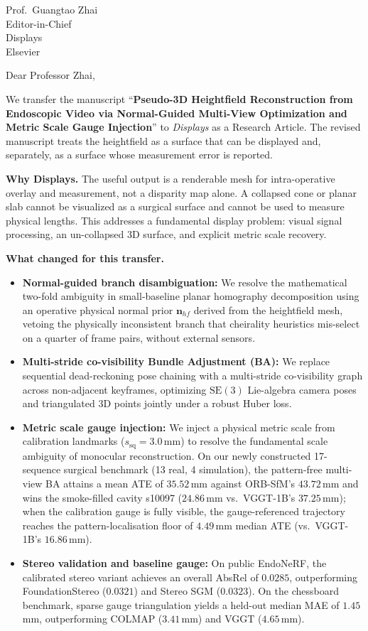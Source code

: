 \documentclass[12pt]{letter}
\begin{document}
\begin{letter}{Prof.\ Guangtao Zhai\\
Editor-in-Chief\\
Displays\\
Elsevier}

\opening{Dear Professor Zhai,}

We transfer the manuscript
``\textbf{Pseudo-3D Heightfield Reconstruction from Endoscopic Video via Normal-Guided Multi-View Optimization and Metric Scale Gauge Injection}''
to \textit{Displays} as a Research Article. The revised manuscript treats the heightfield as a surface that can be displayed and, separately, as a surface whose measurement error is reported.

\textbf{Why Displays.}
The useful output is a renderable mesh for intra-operative overlay and measurement, not a disparity map alone. A collapsed cone or planar slab cannot be visualized as a surgical surface and cannot be used to measure physical lengths. This addresses a fundamental display problem: visual signal processing, an un-collapsed 3D surface, and explicit metric scale recovery.

\textbf{What changed for this transfer.}
\begin{itemize}
    \item \textbf{Normal-guided branch disambiguation:} We resolve the mathematical two-fold ambiguity in small-baseline planar homography decomposition using an operative physical normal prior $\mathbf{n}_{hf}$ derived from the heightfield mesh, vetoing the physically inconsistent branch that cheirality heuristics mis-select on a quarter of frame pairs, without external sensors.
    \item \textbf{Multi-stride co-visibility Bundle Adjustment (BA):} We replace sequential dead-reckoning pose chaining with a multi-stride co-visibility graph across non-adjacent keyframes, optimizing $\mathrm{SE}(3)$ Lie-algebra camera poses and triangulated 3D points jointly under a robust Huber loss.
    \item \textbf{Metric scale gauge injection:} We inject a physical metric scale from calibration landmarks ($s_{\mathrm{sq}} = 3.0$\,mm) to resolve the fundamental scale ambiguity of monocular reconstruction. On our newly constructed 17-sequence surgical benchmark (13 real, 4 simulation), the pattern-free multi-view BA attains a mean ATE of $35.52$\,mm against ORB-SfM's $43.72$\,mm and wins the smoke-filled cavity s10097 ($24.86$\,mm vs.\ VGGT-1B's $37.25$\,mm); when the calibration gauge is fully visible, the gauge-referenced trajectory reaches the pattern-localisation floor of $4.49$\,mm median ATE (vs.\ VGGT-1B's $16.86$\,mm).
    \item \textbf{Stereo validation and baseline gauge:} On public EndoNeRF, the calibrated stereo variant achieves an overall AbsRel of $0.0285$, outperforming FoundationStereo ($0.0321$) and Stereo SGM ($0.0323$). On the chessboard benchmark, sparse gauge triangulation yields a held-out median MAE of $1.45$\,mm, outperforming COLMAP ($3.41$\,mm) and VGGT ($4.65$\,mm).
\end{itemize}


\end{letter}
\end{document}
